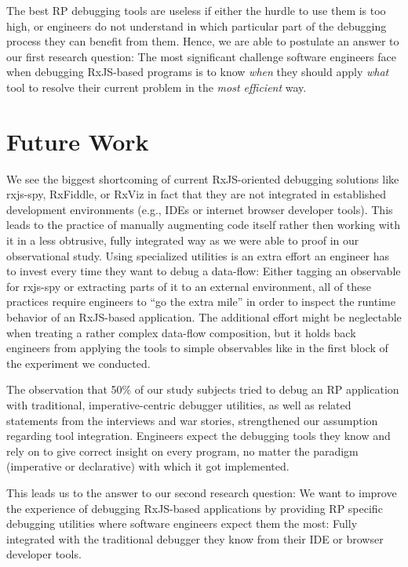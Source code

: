 \documentclass[sigplan,screen,review]{acmart}
\begin{document}
The best RP debugging tools are useless if either the hurdle to use them is too high, or engineers do not understand in which particular part of the debugging process they can benefit from them. Hence, we are able to postulate an answer to our first research question: The most significant challenge software engineers face when debugging RxJS-based programs is to know \emph{when} they should apply \emph{what} tool to resolve their current problem in the \emph{most efficient} way.

\section{Future Work}
\label{sec:future}

We see the biggest shortcoming of current RxJS-oriented debugging solutions like rxjs-spy, RxFiddle, or RxViz in fact that they are not integrated in established development environments (e.g., IDEs or internet browser developer tools). This leads to the practice of manually augmenting code itself rather then working with it in a less obtrusive, fully integrated way as we were able to proof in our observational study. Using specialized utilities is an extra effort an engineer has to invest every time they want to debug a data-flow: Either tagging an observable for rxjs-spy or extracting parts of it to an external environment, all of these practices require engineers to ``go the extra mile'' in order to inspect the runtime behavior of an RxJS-based application. The additional effort might be neglectable when treating a rather complex data-flow composition, but it holds back engineers from applying the tools to simple observables like in the first block of the experiment we conducted.

The observation that 50\% of our study subjects tried to debug an RP application with traditional, imperative-centric debugger utilities, as well as related statements from the interviews and war stories, strengthened our assumption regarding tool integration. Engineers expect the debugging tools they know and rely on to give correct insight on every program, no matter the paradigm (imperative or declarative) with which it got implemented.

This leads us to the answer to our second research question: We want to improve the experience of debugging RxJS-based applications by providing RP specific debugging utilities where software engineers expect them the most: Fully integrated with the traditional debugger they know from their IDE or browser developer tools.
\end{document}
